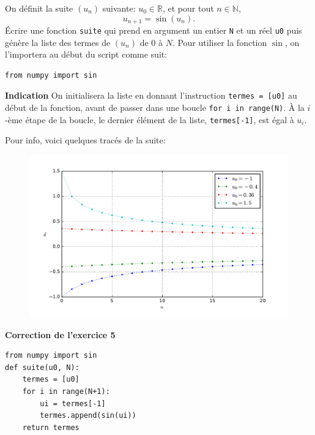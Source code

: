 \begin{frame}[fragile]
\begin{exo}[Suite]
On définit la suite $(u_n)$ suivante: $u_0\in\mathbb{R}$, et pour tout $n\in\mathbb{N}$, \[u_{n+1} = \sin(u_n).\]
\pause
Écrire une fonction \lstinline|suite| qui prend en argument un entier \lstinline|N| et un réel \lstinline|u0| puis génère la liste des termes de $(u_n)$ de $0$ à $N$.
\pause
Pour utiliser la fonction $\sin$, on l'importera au début du script comme suit:
\begin{lstlisting}
from numpy import sin
\end{lstlisting}
\pause

\textbf{Indication} On initialisera la liste en donnant l'instruction \lstinline|termes = [u0]| au début de la fonction, avant de passer dans une boucle \lstinline|for i in range(N)|. À la  $i$-ème étape de la boucle, le dernier élément de la liste, \lstinline|termes[-1]|, est égal à $u_i$.

\end{exo}
\end{frame}

\begin{frame}
Pour info, voici quelques tracés de la suite:
\begin{figure}
\centering
\includegraphics[width=\textwidth]{chope.pdf}
\end{figure}
\end{frame}

\begin{frame}[fragile]
\begin{block}{\textbf{Correction de l'exercice 5}}
\begin{lstlisting}from numpy import sin
def suite(u0, N):
    termes = [u0]
    for i in range(N+1):
        ui = termes[-1]
        termes.append(sin(ui))
    return termes\end{lstlisting}
\end{block}
\end{frame}

